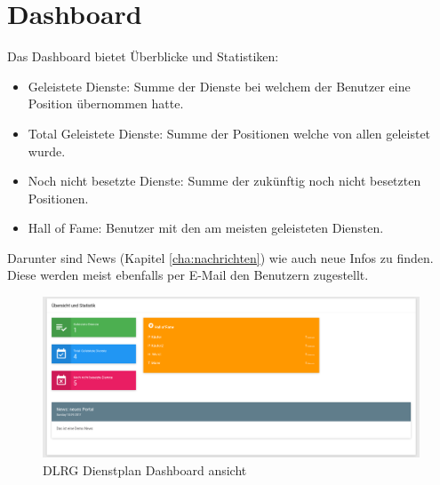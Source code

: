 \chapter{Dashboard}
\label{cha:dashboard}

Das Dashboard bietet Überblicke und Statistiken:

\begin{itemize}
\item Geleistete Dienste: Summe der Dienste bei welchem der Benutzer eine Position übernommen hatte.
\item Total Geleistete Dienste: Summe der Positionen welche von allen geleistet wurde.
\item Noch nicht besetzte Dienste: Summe der zukünftig noch nicht besetzten Positionen.
\item Hall of Fame: Benutzer mit den am meisten geleisteten Diensten. 
\end{itemize}

\noindent Darunter sind News (Kapitel \ref{cha:nachrichten}) wie auch neue Infos zu finden. Diese werden meist ebenfalls per E-Mail den Benutzern zugestellt.

\begin{figure}[h]
 \begin{addmargin}{-0.2\linewidth}
   \centering 
   \includegraphics[width=20cm]{Bilder/view_overview.png}
 \end{addmargin} 
 \caption[Dashboard ansicht]{DLRG Dienstplan Dashboard ansicht}
 \label{fig:view_overview}
\end{figure}